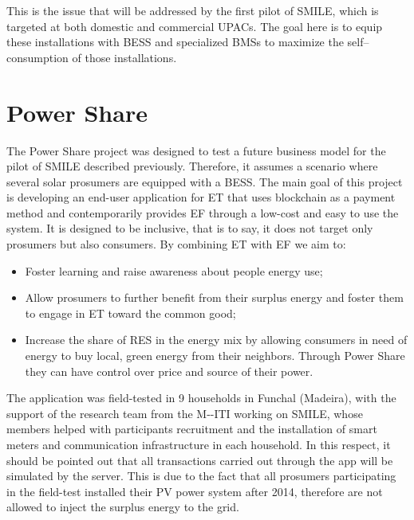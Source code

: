 This is the issue that will be addressed by the first pilot of \ac{SMILE}, which is targeted at both domestic and commercial \acp{UPAC}. The goal here is to equip these installations with BESS and specialized \acp{BMS} to maximize the self--consumption of those installations.


\section{Power Share}
The Power Share project was designed to test a future business model for the pilot of \ac{SMILE} described previously. Therefore, it assumes a scenario where several solar prosumers are equipped with a \ac{BESS}.
The main goal of this project is developing an end-user application for \ac{ET} that uses blockchain as a payment method and contemporarily provides \ac{EF} through a low-cost and easy to use the system. It is designed to be inclusive, that is to say, it does not target only prosumers but also consumers. By combining \ac{ET} with \ac{EF} we aim to:

\begin{itemize}
\item Foster learning and raise awareness about people energy use;
\item Allow prosumers to further benefit from their surplus energy and foster them to engage in \ac{ET} toward the common good;
\item Increase the share of RES in the energy mix by allowing consumers in need of energy to buy local, green energy from their neighbors. Through Power Share they can have control over price and source of their power.
\end{itemize}


The application was field-tested in 9 households in Funchal (Madeira), with the support of the research team from the \ac{M--ITI} working on SMILE, whose members helped with participants recruitment and the installation of smart meters and communication infrastructure in each household.
In this respect, it should be pointed out that all transactions carried out through the app will be simulated by the server. This is due to the fact that all prosumers participating in the field-test installed their \ac{PV} power system after 2014, therefore are not allowed to inject the surplus energy to the grid.



